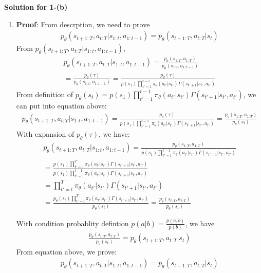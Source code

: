 \documentclass[12pt]{article}
\begin{document}
\begin{enumerate} [label=(\alph*)]
\begin{center}
	\textbf{Solution for 1-(b)}
\end{center}
\begin{enumerate}[label=(\alph*)]
\item 
\textbf{Proof}: From descrption, we need to prove
    \begin{align*}
	p_\theta(s_{t+1:T}, a_{t:T} | s_{1:t}, a_{1:t-1} ) = p_\theta(s_{t+1:T}, a_{t:T} | s_{t} )
	\end{align*}
From $p_\theta(s_{t+1:T}, a_{t:T} | s_{1:t}, a_{1:t-1} )$,
\begin{multline}
  p_\theta(s_{t+1:T}, a_{t:T} | s_{1:t}, a_{1:t-1} ) = \frac{p_\theta(s_{1:T}, a_{1:T})}{p_\theta(s_{1:t}, a_{1:t-1})} \\
  = \frac{p_\theta(\tau)}{p_\theta(s_{1:t}, a_{1:t-1})} = \frac{p_\theta(\tau)}{p(s_1)\prod_{t'=1}^{t-1} \pi_\theta(a_{t'}|s_{t'})\Gamma(s_{t'+1}|s_{t'}, a_{t'})}
\end{multline}
From definition of $p_\theta(s_t) = p(s_1)\prod_{t'=1}^{t-1} \pi_\theta(a_{t'}|s_{t'})\Gamma(s_{t'+1}|s_{t'}, a_{t'})$, we can put into equation above:
\begin{multline}
p_\theta(s_{t+1:T}, a_{t:T} | s_{1:t}, a_{1:t-1} ) = \frac{p_\theta(\tau)}{p(s_1)\prod_{t'=1}^{t-1} \pi_\theta(a_{t'}|s_{t'})\Gamma(s_{t'+1}|s_{t'}, a_{t'})} = \frac{p_\theta(s_{1:T}, a_{1:T})}{p_\theta(s_t)}
\end{multline}
With expansion of $p_\theta(\tau)$, we have:
\begin{multline}
p_\theta(s_{t+1:T}, a_{t:T} | s_{1:t}, a_{1:t-1} ) = \frac{p_\theta(s_{1:T}, a_{1:T})}{p(s_1)\prod_{t'=1}^{t-1} \pi_\theta(a_{t'}|s_{t'})\Gamma(s_{t'+1}|s_{t'}, a_{t'})} \\
= \frac{p(s_1)\prod_{t'=1}^{T} \pi_\theta(a_{t'}|s_{t'})\Gamma(s_{t'+1}|s_{t'}, a_{t'})}{p(s_1)\prod_{t'=1}^{t-1} \pi_\theta(a_{t'}|s_{t'})\Gamma(s_{t'+1}|s_{t'}, a_{t'})} \\
= \prod_{t'=t}^{T} \pi_\theta(a_{t'}|s_{t'})\Gamma(s_{t'+1}|s_{t'}, a_{t'}) \\
= \frac{p_\theta(s_t)\prod_{t'=t}^{T} \pi_\theta(a_{t'}|s_{t'})\Gamma(s_{t'+1}|s_{t'}, a_{t'})}{p_\theta(s_t)}
= \frac{p_\theta(s_{t:T}, a_{t:T})}{p_\theta(s_t)} 
\end{multline}

With condition probablity defintion $p(a|b) = \frac{p(a, b)}{p(b)}$, we have
    \begin{align*}
	 \frac{p_\theta(s_{t:T}, a_{t:T})}{p_\theta(s_t)}  = p_\theta(s_{t+1:T}, a_{t:T} | s_t) 
    \end{align*}
From equation above, we prove:
    \begin{align*}
	p_\theta(s_{t+1:T}, a_{t:T} | s_{1:t}, a_{1:t-1} ) = p_\theta(s_{t+1:T}, a_{t:T} | s_{t} )
	\end{align*}


\end{enumerate}
\end{enumerate}
\end{document}
